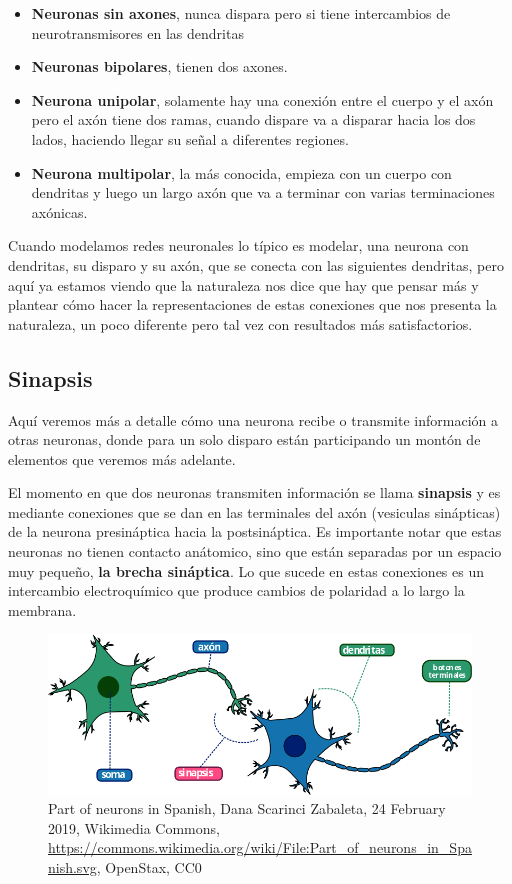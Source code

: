 \begin{itemize}
\item \textbf{Neuronas sin axones}, nunca dispara pero si tiene intercambios de neurotransmisores en las dendritas   
\item \textbf{Neuronas bipolares}, tienen dos axones. 
\item \textbf{Neurona unipolar}, solamente hay una conexión entre el cuerpo y el axón pero el axón tiene dos ramas, cuando dispare va a disparar hacia los dos lados, haciendo llegar su señal a diferentes regiones. 
\item \textbf{Neurona multipolar}, la más conocida, empieza con un cuerpo con dendritas y luego un largo axón que va a terminar con varias terminaciones axónicas. 
\end{itemize}

Cuando modelamos redes neuronales lo típico es modelar, una neurona con dendritas, su disparo y su axón, que se conecta con las siguientes dendritas, pero aquí ya estamos viendo que la naturaleza nos dice que hay que pensar más y plantear cómo hacer la representaciones de estas conexiones que nos presenta la naturaleza, un poco diferente pero tal vez con resultados más satisfactorios.


\subsection{Sinapsis}

Aquí veremos más a detalle cómo una neurona recibe o transmite información a otras neuronas, donde para un solo disparo están participando un montón de elementos que veremos más adelante.

 El momento en que dos neuronas transmiten información se llama \textbf{sinapsis} y es mediante conexiones que se dan en las terminales del axón (vesiculas sinápticas) de la neurona presináptica hacia la postsináptica. Es importante notar que estas neuronas no tienen contacto anátomico, sino que están separadas por un espacio muy pequeño, \textbf{la brecha sináptica}. Lo que sucede en estas conexiones es un intercambio electroquímico que produce cambios de polaridad a lo largo la membrana. 


\begin{figure}[h]
 \centering
 \includegraphics[scale=0.5]{../Figuras/Part_of_neurons_in_Spanish.png}
 \caption{Part of neurons in Spanish, Dana Scarinci Zabaleta, 24 February 2019, Wikimedia Commons, \url{https://commons.wikimedia.org/wiki/File:Part_of_neurons_in_Spanish.svg}, OpenStax, CC0}
 \label{fig:sinapsisN}
\end{figure}

